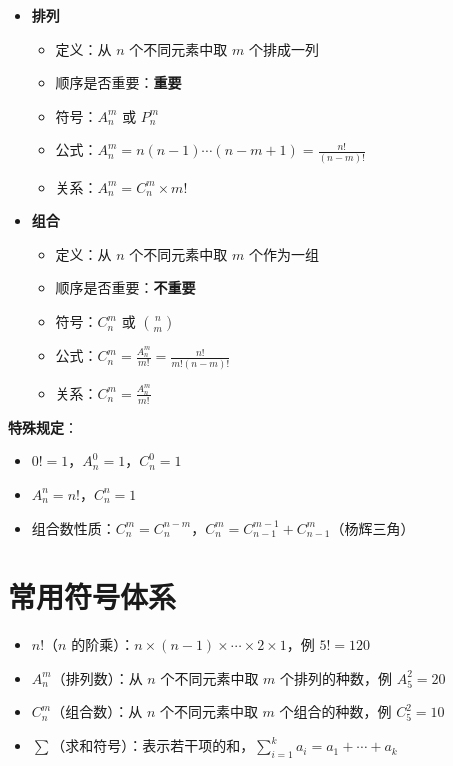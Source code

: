 \documentclass[10pt]{article}
\begin{document}
\begin{itemize}
\item \textbf{排列}
  \begin{itemize}
  \item 定义：从 \(n\) 个不同元素中取 \(m\) 个排成一列
  \item 顺序是否重要：\textbf{重要}
  \item 符号：\(A_n^m\) 或 \(P_n^m\)
  \item 公式：\(A_n^m = n(n-1)\cdots(n-m+1) = \frac{n!}{(n-m)!}\)
  \item 关系：\(A_n^m = C_n^m \times m!\)
  \end{itemize}
\item \textbf{组合}
  \begin{itemize}
  \item 定义：从 \(n\) 个不同元素中取 \(m\) 个作为一组
  \item 顺序是否重要：\textbf{不重要}
  \item 符号：\(C_n^m\) 或 \(\binom{n}{m}\)
  \item 公式：\(C_n^m = \frac{A_n^m}{m!} = \frac{n!}{m!(n-m)!}\)
  \item 关系：\(C_n^m = \frac{A_n^m}{m!}\)
  \end{itemize}
\end{itemize}

\textbf{特殊规定}：
\begin{itemize}
\item \(0! = 1\)，\(A_n^0 = 1\)，\(C_n^0 = 1\)
\item \(A_n^n = n!\)，\(C_n^n = 1\)
\item 组合数性质：\(C_n^m = C_n^{n-m}\)，\(C_n^m = C_{n-1}^{m-1} + C_{n-1}^{m}\)（杨辉三角）
\end{itemize}

\section{常用符号体系}

\begin{itemize}
\item \(n!\)（\(n\) 的阶乘）：\(n \times (n-1) \times \cdots \times 2 \times 1\)，例 \(5! = 120\)
\item \(A_n^m\)（排列数）：从 \(n\) 个不同元素中取 \(m\) 个排列的种数，例 \(A_5^2 = 20\)
\item \(C_n^m\)（组合数）：从 \(n\) 个不同元素中取 \(m\) 个组合的种数，例 \(C_5^2 = 10\)
\item \(\sum\)（求和符号）：表示若干项的和，\(\sum_{i=1}^{k} a_i = a_1+\cdots+a_k\)
\end{itemize}
\end{document}
